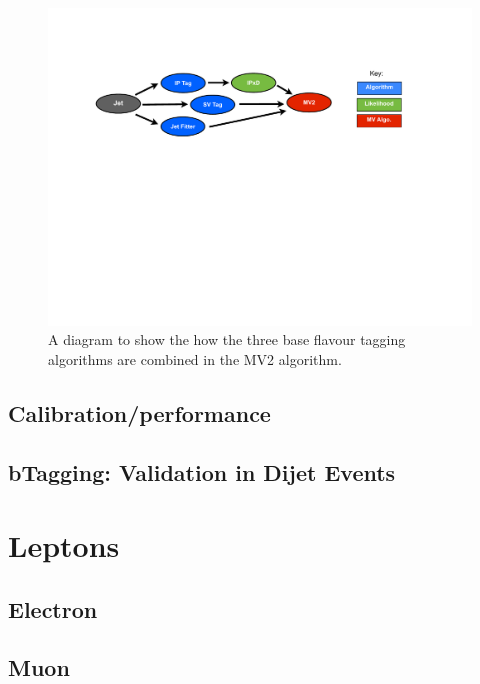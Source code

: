    \begin{figure}[!htb]
     \begin{center}
       \includegraphics[width=1.0\textwidth]{figs/Objects/MV2_schem.pdf}
       \caption{A diagram to show the how the three base flavour tagging algorithms are combined in the MV2 algorithm.}
       \label{fig:obj-MV2_schem}
     \end{center}
     \vspace{-1cm}
   \end{figure}
   
   
   \subsection{Calibration/performance}
   \subsection{bTagging: Validation in Dijet Events}
    
  \section{Leptons}   
  \subsection{Electron}
  \label{sec:obj-electron}
  \subsection{Muon}
  \label{sec:obj-muon}
    
